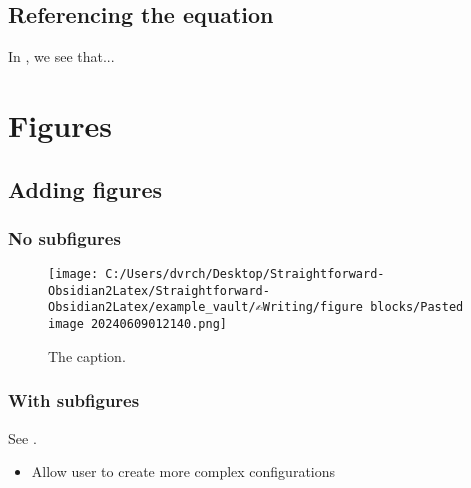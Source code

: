 \documentclass{extarticle}
\begin{document}
\subsection{Referencing the equation}

In , we see that...

\section{Figures}

\subsection{Adding figures}

\subsubsection{No subfigures}


\begin{figure}[htb]
\centering
\texttt{[image: C:/Users/dvrch/Desktop/Straightforward-Obsidian2Latex/Straightforward-Obsidian2Latex/example\_vault/✍Writing/figure blocks/Pasted image 20240609012140.png]}
\caption[]{The caption.}

\label{fig:gradient_steps}
\end{figure}




\subsubsection{With subfigures}

See .





\begin{itemize}

\item {}  Allow user to create more complex configurations

\end{itemize}
\end{document}
